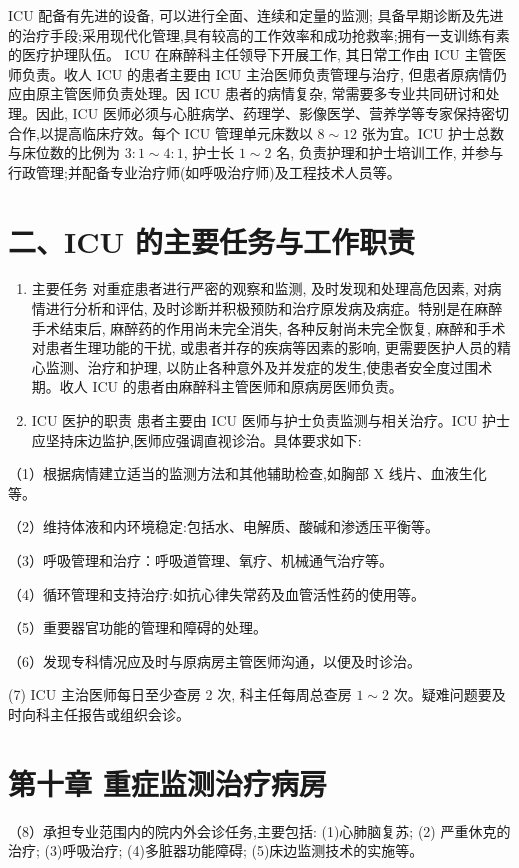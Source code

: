 \documentclass[10pt]{article}
\begin{document}
ICU 配备有先进的设备, 可以进行全面、连续和定量的监测; 具备早期诊断及先进的治疗手段;采用现代化管理,具有较高的工作效率和成功抢救率;拥有一支训练有素的医疗护理队伍。 ICU 在麻醉科主任领导下开展工作, 其日常工作由 ICU 主管医师负责。收人 ICU 的患者主要由 ICU 主治医师负责管理与治疗, 但患者原病情仍应由原主管医师负责处理。因 ICU 患者的病情复杂, 常需要多专业共同研讨和处理。因此, ICU 医师必须与心脏病学、药理学、影像医学、营养学等专家保持密切合作,以提高临床疗效。每个 ICU 管理单元床数以 $8 \sim 12$ 张为宜。ICU 护士总数与床位数的比例为 $3: 1 \sim 4: 1$, 护士长 $1 \sim 2$ 名, 负责护理和护士培训工作, 并参与行政管理;并配备专业治疗师(如呼吸治疗师)及工程技术人员等。

\section*{二、ICU 的主要任务与工作职责}
\begin{enumerate}
  \item 主要任务 对重症患者进行严密的观察和监测, 及时发现和处理高危因素, 对病情进行分析和评估, 及时诊断并积极预防和治疗原发病及病症。特别是在麻醉手术结束后, 麻醉药的作用尚未完全消失, 各种反射尚未完全恢复, 麻醉和手术对患者生理功能的干扰, 或患者并存的疾病等因素的影响, 更需要医护人员的精心监测、治疗和护理, 以防止各种意外及并发症的发生,使患者安全度过围术期。收人 ICU 的患者由麻醉科主管医师和原病房医师负责。

  \item ICU 医护的职责 患者主要由 ICU 医师与护士负责监测与相关治疗。ICU 护士应坚持床边监护,医师应强调直视诊治。具体要求如下:

\end{enumerate}

（1）根据病情建立适当的监测方法和其他辅助检查,如胸部 X 线片、血液生化等。

（2）维持体液和内环境稳定:包括水、电解质、酸碱和渗透压平衡等。

（3）呼吸管理和治疗：呼吸道管理、氧疗、机械通气治疗等。

（4）循环管理和支持治疗:如抗心律失常药及血管活性药的使用等。

（5）重要器官功能的管理和障碍的处理。

（6）发现专科情况应及时与原病房主管医师沟通，以便及时诊治。

(7) ICU 主治医师每日至少查房 2 次, 科主任每周总查房 $1 \sim 2$ 次。疑难问题要及时向科主任报告或组织会诊。

\section*{第十章 重症监测治疗病房}
（8）承担专业范围内的院内外会诊任务,主要包括: (1)心肺脑复苏; (2) 严重休克的治疗; (3)呼吸治疗; (4)多脏器功能障碍; (5)床边监测技术的实施等。
\end{document}
